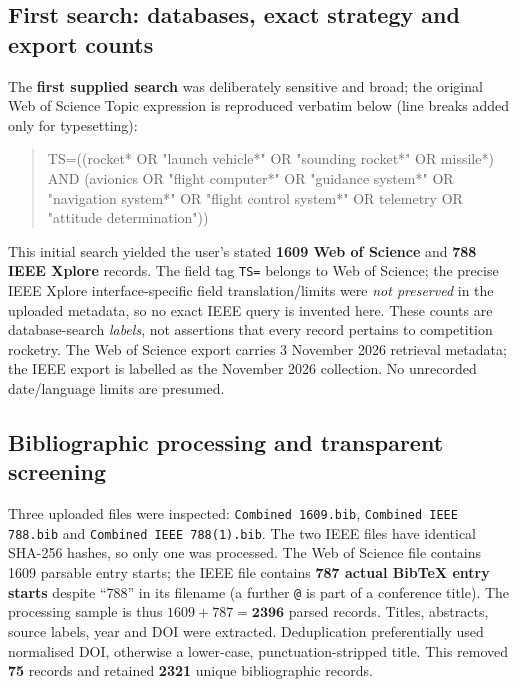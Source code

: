\documentclass[10pt,a4paper]{article}
\begin{document}
\subsection{First search: databases, exact strategy and export counts}
The \textbf{first supplied search} was deliberately sensitive and broad; the original Web of Science Topic expression is reproduced verbatim below (line breaks added only for typesetting):
\begin{quote}\small\ttfamily
TS=((rocket* OR "launch vehicle*" OR "sounding rocket*" OR missile*)\newline
AND (avionics OR "flight computer*" OR "guidance system*"\newline
OR "navigation system*" OR "flight control system*"\newline
OR telemetry OR "attitude determination"))
\end{quote}
This initial search yielded the user's stated \textbf{1609 Web of Science} and \textbf{788 IEEE Xplore} records. The field tag \texttt{TS=} belongs to Web of Science; the precise IEEE Xplore interface-specific field translation/limits were \emph{not preserved} in the uploaded metadata, so no exact IEEE query is invented here. These counts are database-search \emph{labels}, not assertions that every record pertains to competition rocketry. The Web of Science export carries 3 November 2026 retrieval metadata; the IEEE export is labelled as the November 2026 collection. No unrecorded date/language limits are presumed.

\subsection{Bibliographic processing and transparent screening}
Three uploaded files were inspected: \texttt{Combined 1609.bib}, \texttt{Combined IEEE 788.bib} and \texttt{Combined IEEE 788(1).bib}. The two IEEE files have identical SHA-256 hashes, so only one was processed. The Web of Science file contains 1609 parsable entry starts; the IEEE file contains \textbf{787 actual BibTeX entry starts} despite ``788'' in its filename (a further \texttt{@} is part of a conference title). The processing sample is thus $1609+787=\mathbf{2396}$ parsed records. Titles, abstracts, source labels, year and DOI were extracted. Deduplication preferentially used normalised DOI, otherwise a lower-case, punctuation-stripped title. This removed \textbf{75} records and retained \textbf{2321} unique bibliographic records.
\end{document}
